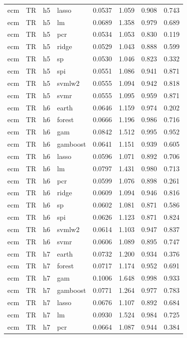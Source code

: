 \begin{ThreePartTable}
\begin{longtable}[t]{llclcccc}
ecm & TR & h5 & lasso & 0.0537 & 1.059 & 0.908 & 0.743\\
ecm & TR & h5 & lm & 0.0689 & 1.358 & 0.979 & 0.689\\
ecm & TR & h5 & pcr & 0.0534 & 1.053 & 0.830 & 0.119\\
ecm & TR & h5 & ridge & 0.0529 & 1.043 & 0.888 & 0.599\\
ecm & TR & h5 & sp & 0.0530 & 1.046 & 0.823 & 0.332\\
ecm & TR & h5 & spi & 0.0551 & 1.086 & 0.941 & 0.871\\
ecm & TR & h5 & svmlw2 & 0.0555 & 1.094 & 0.942 & 0.818\\
ecm & TR & h5 & svmr & 0.0555 & 1.095 & 0.959 & 0.871\\
\addlinespace
ecm & TR & h6 & earth & 0.0646 & 1.159 & 0.974 & 0.202\\
ecm & TR & h6 & forest & 0.0666 & 1.196 & 0.986 & 0.716\\
ecm & TR & h6 & gam & 0.0842 & 1.512 & 0.995 & 0.952\\
ecm & TR & h6 & gamboost & 0.0641 & 1.151 & 0.939 & 0.605\\
ecm & TR & h6 & lasso & 0.0596 & 1.071 & 0.892 & 0.706\\
ecm & TR & h6 & lm & 0.0797 & 1.431 & 0.980 & 0.713\\
ecm & TR & h6 & pcr & 0.0599 & 1.076 & 0.898 & 0.261\\
ecm & TR & h6 & ridge & 0.0609 & 1.094 & 0.946 & 0.816\\
ecm & TR & h6 & sp & 0.0602 & 1.081 & 0.871 & 0.586\\
ecm & TR & h6 & spi & 0.0626 & 1.123 & 0.871 & 0.824\\
ecm & TR & h6 & svmlw2 & 0.0614 & 1.103 & 0.947 & 0.837\\
ecm & TR & h6 & svmr & 0.0606 & 1.089 & 0.895 & 0.747\\
\addlinespace
ecm & TR & h7 & earth & 0.0732 & 1.200 & 0.934 & 0.376\\
ecm & TR & h7 & forest & 0.0717 & 1.174 & 0.952 & 0.691\\
ecm & TR & h7 & gam & 0.1006 & 1.648 & 0.998 & 0.933\\
ecm & TR & h7 & gamboost & 0.0771 & 1.264 & 0.977 & 0.783\\
ecm & TR & h7 & lasso & 0.0676 & 1.107 & 0.892 & 0.684\\
ecm & TR & h7 & lm & 0.0930 & 1.524 & 0.984 & 0.725\\
ecm & TR & h7 & pcr & 0.0664 & 1.087 & 0.944 & 0.384\\

\end{longtable}
\end{ThreePartTable}
